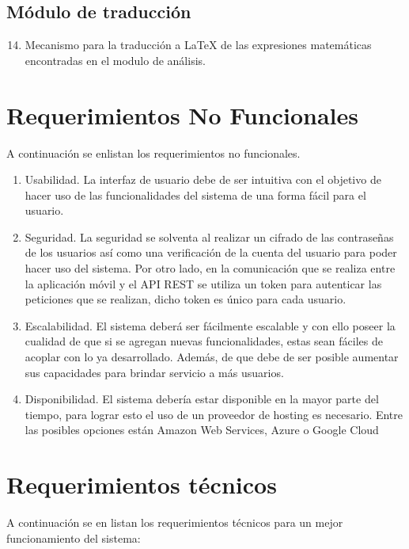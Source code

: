     \subsection{Módulo de traducción}
    \begin{enumerate}[label=RF\arabic*.]
    	\setcounter{enumi}{13}
    	\item Mecanismo para la traducción a \LaTeX{} de las expresiones matemáticas encontradas en el modulo de análisis.
    \end{enumerate}
    
\section{Requerimientos No Funcionales} 
    A continuación se enlistan los requerimientos no funcionales.
        \begin{enumerate}[label=RNF\arabic*.]
            \item Usabilidad. La interfaz de usuario debe de ser intuitiva con el objetivo de hacer uso de las funcionalidades del sistema de una forma fácil para el usuario.
            
            \item Seguridad. La seguridad se solventa al realizar un cifrado de las contraseñas de los usuarios así como una verificación de la cuenta del usuario para poder hacer uso del sistema. Por otro lado, en la comunicación que se realiza entre la aplicación móvil y el API REST se utiliza un token para autenticar las peticiones que se realizan, dicho token es único para cada usuario. 
            
            \item Escalabilidad. El sistema deberá ser fácilmente escalable y con ello poseer la cualidad de que si se agregan nuevas funcionalidades, estas sean fáciles de acoplar con lo ya desarrollado. Además, de que debe de ser posible aumentar sus capacidades para brindar servicio a más usuarios.
            
            \item Disponibilidad. El sistema debería estar disponible en la mayor parte del tiempo, para lograr esto el uso de un proveedor de hosting es necesario. Entre las posibles opciones están Amazon Web Services, Azure o Google Cloud
            
        \end{enumerate}    
\section{Requerimientos técnicos}
    A continuación se en listan los requerimientos técnicos para un mejor funcionamiento del sistema:
